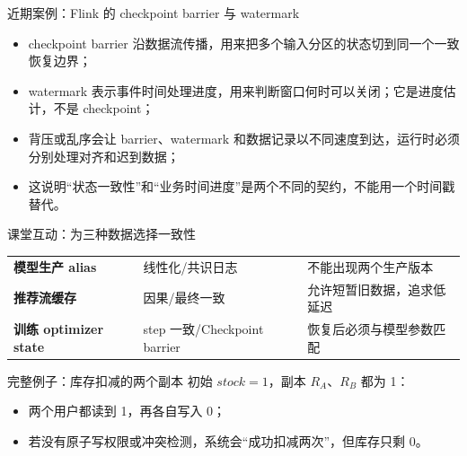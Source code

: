 \documentclass[UTF8,fontset=none,aspectratio=169,10pt]{beamer}
\begin{document}
\begin{frame}{近期案例：Flink 的 checkpoint barrier 与 watermark}
\begin{itemize}
  \item checkpoint barrier 沿数据流传播，用来把多个输入分区的状态切到同一个一致恢复边界；
  \item watermark 表示事件时间处理进度，用来判断窗口何时可以关闭；它是进度估计，不是 checkpoint；
  \item 背压或乱序会让 barrier、watermark 和数据记录以不同速度到达，运行时必须分别处理对齐和迟到数据；
  \item 这说明“状态一致性”和“业务时间进度”是两个不同的契约，不能用一个时间戳替代。
\end{itemize}
\vfill
{}
\end{frame}

\begin{frame}{课堂互动：为三种数据选择一致性}
\begin{tabularx}{\linewidth}{>{\bfseries}p{3.1cm}XX}
\toprule
模型生产 alias & 线性化/共识日志 & 不能出现两个生产版本 \\
推荐流缓存 & 因果/最终一致 & 允许短暂旧数据，追求低延迟 \\
训练 optimizer state & step 一致/Checkpoint barrier & 恢复后必须与模型参数匹配 \\
\bottomrule
\end{tabularx}
\vfill
{}
\end{frame}


\begin{frame}{完整例子：库存扣减的两个副本}
初始 $stock=1$，副本 $R_A$、$R_B$ 都为 1：
\begin{center}
\end{center}
\begin{itemize}
  \item 两个用户都读到 1，再各自写入 0；
  \item 若没有原子写权限或冲突检测，系统会“成功扣减两次”，但库存只剩 0。
\end{itemize}
\end{frame}
\end{document}

